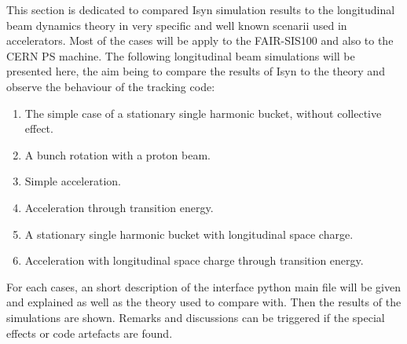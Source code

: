 This section is dedicated to compared Isyn simulation results to the longitudinal beam dynamics theory in very specific and well known scenarii used in accelerators. Most of the cases will be apply to the FAIR-SIS100 and also to the CERN PS machine. The following longitudinal beam simulations will be presented here, the aim being to compare the results of Isyn to the theory and observe the behaviour of the tracking code:
\begin{enumerate}
\item The simple case of a stationary single harmonic bucket, without collective effect.
\item A bunch rotation with a proton beam.
\item Simple acceleration.
\item Acceleration through transition energy.
\item A stationary single harmonic bucket with longitudinal space charge.
\item Acceleration with longitudinal space charge through transition energy.
\end{enumerate}

For each cases, an short description of the interface python main file will be given and explained as well as the theory used to compare with. Then the results of the simulations are shown. Remarks and discussions can be triggered if the  special effects or code artefacts are found.

